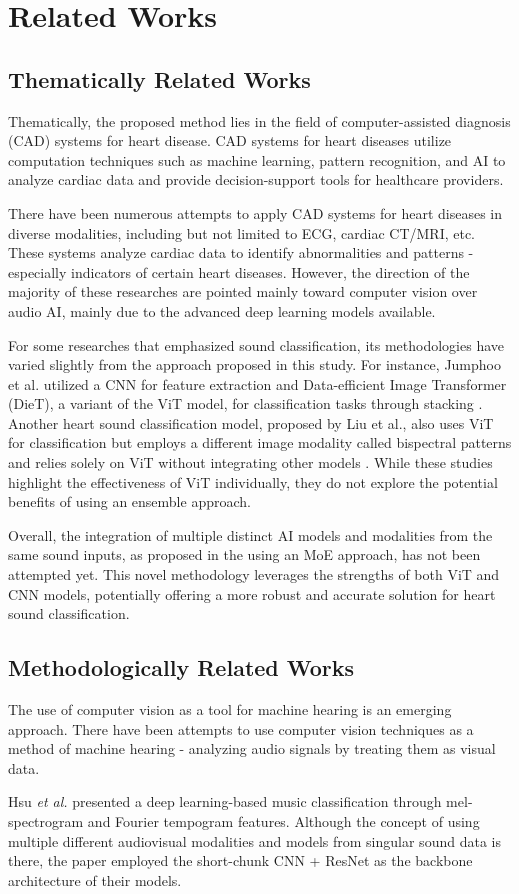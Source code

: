 \section{Related Works} \label{related_works}
\subsection{Thematically Related Works}
Thematically, the proposed method lies in the field of computer-assisted diagnosis (CAD) systems for heart disease. CAD systems for heart diseases utilize computation techniques such as machine learning, pattern recognition, and AI to analyze cardiac data and provide decision-support tools for healthcare providers.

There have been numerous attempts to apply CAD systems for heart diseases in diverse modalities, including but not limited to ECG, cardiac CT/MRI, etc. These systems analyze cardiac data to identify abnormalities and patterns - especially indicators of certain heart diseases. However, the direction of the majority of these researches are pointed mainly toward computer vision over audio AI, mainly due to the advanced deep learning models available.

For some researches that emphasized sound classification, its methodologies have varied slightly from the approach proposed in this study. For instance, Jumphoo et al. utilized a CNN for feature extraction and Data-efficient Image Transformer (DieT), a variant of the ViT model, for classification tasks through stacking \cite{jumphoo_exploiting_2024}. Another heart sound classification model, proposed by Liu et al., also uses ViT for classification but employs a different image modality called bispectral patterns and relies solely on ViT without integrating other models \cite{liu_heart_2023}. While these studies highlight the effectiveness of ViT individually, they do not explore the potential benefits of using an ensemble approach.

Overall, the integration of multiple distinct AI models and modalities from the same sound inputs, as proposed in the \ENACT using an MoE approach, has not been attempted yet. This novel methodology leverages the strengths of both ViT and CNN models, potentially offering a more robust and accurate solution for heart sound classification.

\subsection{Methodologically Related Works}
The use of computer vision as a tool for machine hearing is an emerging approach. There have been attempts to use computer vision techniques as a method of machine hearing - analyzing audio signals by treating them as visual data. 

Hsu \textit{et al.} \cite{hsu_deep_2021} presented a deep learning-based music classification through mel-spectrogram and Fourier tempogram features. Although the concept of using multiple different audiovisual modalities and models from singular sound data is there, the paper employed the short-chunk CNN + ResNet as the backbone architecture of their models.
